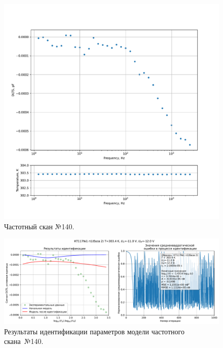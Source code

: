 \begin{figure}[!ht]
    \centering
    \includegraphics[width=1\textwidth]{../plots/КТ117№1_п1(база 2)_2500Гц-1Гц_1пФ_+30С_-11В-12В_20мВ_20мкс_шаг_0,1.pdf}
    \caption{Частотный скан №140.}
    \label{pic:frequency_scan_140}
\end{figure}

\begin{figure}[!ht]
    \centering
    \includegraphics[width=1\textwidth]{../plots/КТ117№1_п1(база 2)_2500Гц-1Гц_1пФ_+30С_-11В-12В_20мВ_20мкс_шаг_0,1_model.pdf}
    \caption{Результаты идентификации параметров модели частотного скана~№140.}
    \label{pic:frequency_scan_model140}
\end{figure}

\pagebreak


